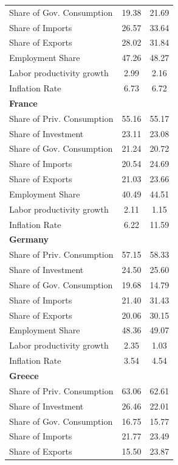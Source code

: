 \documentclass[12pt]{article}
\begin{document}
\begin{appendices}
\begin{center}
\begin{longtable}{lcc}
Share of Gov. Consumption &     19.38 &     21.69 \\  
Share of Imports &     26.57 &     33.64 \\  
Share of Exports &     28.02 &     31.84 \\  
Employment Share &     47.26 &     48.27 \\  
Labor productivity growth &      2.99 &      2.16 \\  
Inflation Rate &      6.73 &      6.72 \\    \hline
\textbf{France} &  &  \\  
Share of Priv. Consumption &     55.16 &     55.17 \\  
Share of Investment &     23.11 &     23.08 \\  
Share of Gov. Consumption &     21.24 &     20.72 \\  
Share of Imports &     20.54 &     24.69 \\  
Share of Exports &     21.03 &     23.66 \\  
Employment Share &     40.49 &     44.51 \\  
Labor productivity growth &      2.11 &      1.15 \\  
Inflation Rate &      6.22 &     11.59 \\   \hline
\textbf{Germany} &  &  \\  
Share of Priv. Consumption &     57.15 &     58.33 \\  
Share of Investment &     24.50 &     25.60 \\  
Share of Gov. Consumption &     19.68 &     14.79 \\  
Share of Imports &     21.40 &     31.43 \\  
Share of Exports &     20.06 &     30.15 \\  
Employment Share &     48.36 &     49.07 \\  
Labor productivity growth &      2.35 &      1.03 \\  
Inflation Rate &      3.54 &      4.54 \\  \hline
\textbf{Greece} &  &  \\  
Share of Priv. Consumption &     63.06 &     62.61 \\  
Share of Investment &     26.46 &     22.01 \\  
Share of Gov. Consumption &     16.75 &     15.77 \\  
Share of Imports &     21.77 &     23.49 \\  
Share of Exports &     15.50 &     23.87 \\  

\end{longtable}
\end{center}
\end{appendices}
\end{document}
